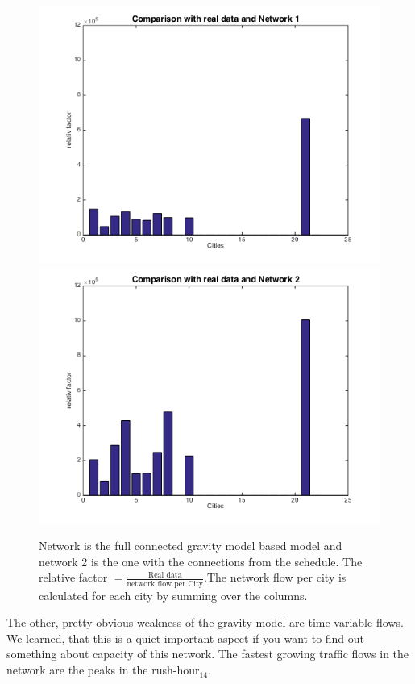 \documentclass[11pt]{article}
\begin{document}
\begin{figure}[h]
\includegraphics[scale=0.4]{compare1}
\includegraphics[scale=0.4]{compare2}
 \caption{Network is the full connected gravity model based model and network 2 is the one with the connections from the schedule. The relative factor $=\frac{\text{Real data}}{\text{network flow per City}}$.The network flow per city is calculated for each city by summing over the columns.}
\end{figure}



The other, pretty obvious weakness of the gravity model are time variable flows. We learned, that this is a quiet important aspect if you want to find out something about capacity of this network. The fastest growing traffic flows in the network are the peaks in the rush-hour$_{14}$.
\end{document}
